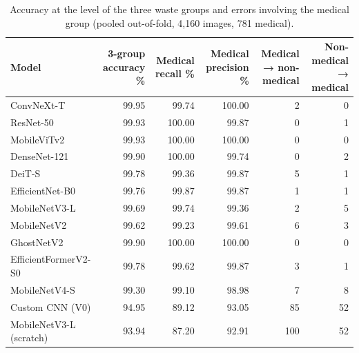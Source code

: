 \begin{table}
\caption{Accuracy at the level of the three waste groups and errors involving the medical group (pooled out-of-fold, 4,160 images, 781 medical).}
\label{tab:table_groups_medical}
\begin{tabular}{lrrrrr}
\toprule
Model & 3-group accuracy \% & Medical recall \% & Medical precision \% & Medical → non-medical & Non-medical → medical \\
\midrule
ConvNeXt-T & 99.95 & 99.74 & 100.00 & 2 & 0 \\
ResNet-50 & 99.93 & 100.00 & 99.87 & 0 & 1 \\
MobileViTv2 & 99.93 & 100.00 & 100.00 & 0 & 0 \\
DenseNet-121 & 99.90 & 100.00 & 99.74 & 0 & 2 \\
DeiT-S & 99.78 & 99.36 & 99.87 & 5 & 1 \\
EfficientNet-B0 & 99.76 & 99.87 & 99.87 & 1 & 1 \\
MobileNetV3-L & 99.69 & 99.74 & 99.36 & 2 & 5 \\
MobileNetV2 & 99.62 & 99.23 & 99.61 & 6 & 3 \\
GhostNetV2 & 99.90 & 100.00 & 100.00 & 0 & 0 \\
EfficientFormerV2-S0 & 99.78 & 99.62 & 99.87 & 3 & 1 \\
MobileNetV4-S & 99.30 & 99.10 & 98.98 & 7 & 8 \\
Custom CNN (V0) & 94.95 & 89.12 & 93.05 & 85 & 52 \\
MobileNetV3-L (scratch) & 93.94 & 87.20 & 92.91 & 100 & 52 \\
\bottomrule
\end{tabular}
\end{table}
